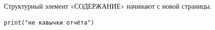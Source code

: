 Структурный элемент «СОДЕРЖАНИЕ» начинают с новой страницы.

\begin{lstlisting}
print("не кавычки отчёта")
\end{lstlisting}
